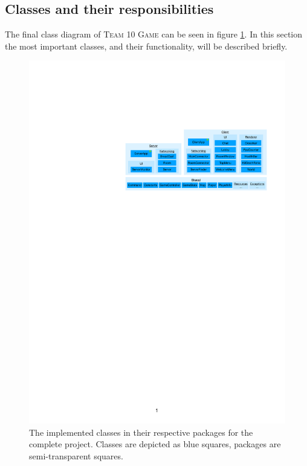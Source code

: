 


\subsection{Classes and their responsibilities}
The final class diagram of \textsc{Team 10 Game} can be seen in figure \ref{fig:ClassesAndPackages}. In this section the most important classes, and their functionality, will be described briefly.

\begin{figure}
    \centering
    \includegraphics[width=\textwidth]{figures/ClassesAndPackages.pdf}
    \caption{The implemented classes in their respective packages for the complete project. Classes are depicted as blue squares, packages are semi-transparent squares.}
    \label{fig:ClassesAndPackages}
\end{figure}

